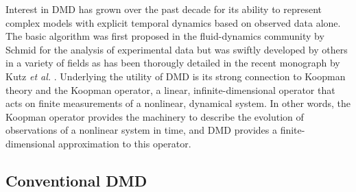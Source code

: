 \documentclass{anstrans}
\begin{document}
Interest in DMD has grown over the past decade for its ability to represent complex models with explicit temporal dynamics based on observed data alone.  
The basic algorithm was first proposed in the fluid-dynamics community by Schmid for the analysis of experimental data \cite{schmid:hal-01053394, schmid2010dynamic} but was swiftly developed by others in a variety of fields as has been thorougly detailed in the recent monograph by Kutz {\it et al.} \cite{kutzbook}.
Underlying the utility of DMD is its strong connection to Koopman theory and the Koopman operator, a linear, infinite-dimensional operator that acts on finite measurements of a nonlinear, dynamical system.
In other words, the Koopman operator provides the machinery to describe the evolution of observations of a nonlinear system in time, and DMD provides a finite-dimensional approximation to this operator.

\subsection{Conventional DMD} 
\end{document}
